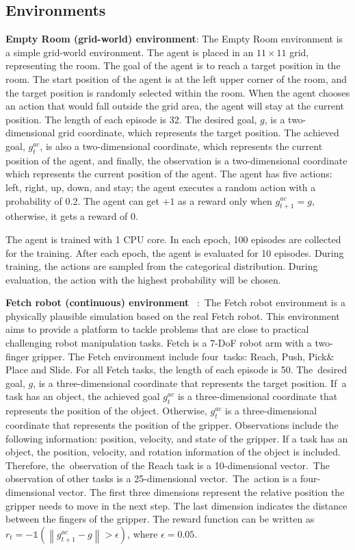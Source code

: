 \subsection{Environments}
\textbf{{Empty Room (grid-world) environment}}:
The Empty Room environment is a simple grid-world environment. The agent is placed in an $11\times11$ grid, representing the room. The goal of the agent is to reach a target position in the room. The start position of the agent is at the left upper corner of the room, and the target position is randomly selected  within the room. When the agent chooses an action that would fall outside the grid area, the agent will stay at the current position. The length of each episode is 32. 
The desired goal, $g$, is a two-dimensional grid coordinate, which represents the target position. The achieved goal, $g^{ac}_{t}$, is also a two-dimensional coordinate, which represents the current position of the agent, and finally, the observation is a two-dimensional coordinate which represents the current position of the agent. 
The agent has five actions: left, right, up, down, and stay; the agent executes a random action with a probability of 0.2. The agent can get $+1$ as a reward only when $g^{ac}_{t+1}=g$, otherwise, it gets a reward of $0$. 

The agent is trained with 1 CPU core. In each epoch, 100 episodes are collected for the training. After each epoch, the agent is evaluated for 10 episodes. During training, the actions are sampled from the categorical distribution. During evaluation, the action with the highest probability will be chosen. 

\textbf{{Fetch robot (continuous) environment}%
}~\cite{plappert2018multi}:~The Fetch robot environment is a physically plausible simulation based on the real Fetch robot. This environment aims to provide a platform to tackle problems that are close to practical challenging robot manipulation tasks. Fetch is a 7-DoF robot arm with a two-finger gripper. The Fetch environment include four~tasks: Reach, Push, Pick$\&$Place and Slide. For all Fetch tasks, the length of each episode is 50. The~desired goal, $g$, is a three-dimensional coordinate that represents the target position. If~a task has an object, the achieved goal $g^{ac}_{t}$ is a three-dimensional coordinate that represents the position of the object. Otherwise, $g^{ac}_{t}$ is a three-dimensional coordinate that represents the position of the gripper.
Observations include the following information: position, velocity, and state of the gripper. If a task has an object, the position, velocity, and rotation information of the object is included. Therefore, the~observation of the Reach task is a 10-dimensional vector.~The observation of other tasks is a 25-dimensional vector.~The~action is a four-dimensional vector. The first three dimensions represent the relative position the gripper needs to move in the next step. The last dimension indicates the distance between the fingers of the gripper.
The reward function can be written as $r_{t}=-\mathds{1}\left(\left\|g^{ac}_{t+1} - g\right\|>\epsilon\right)$, where $\epsilon =0.05$.

